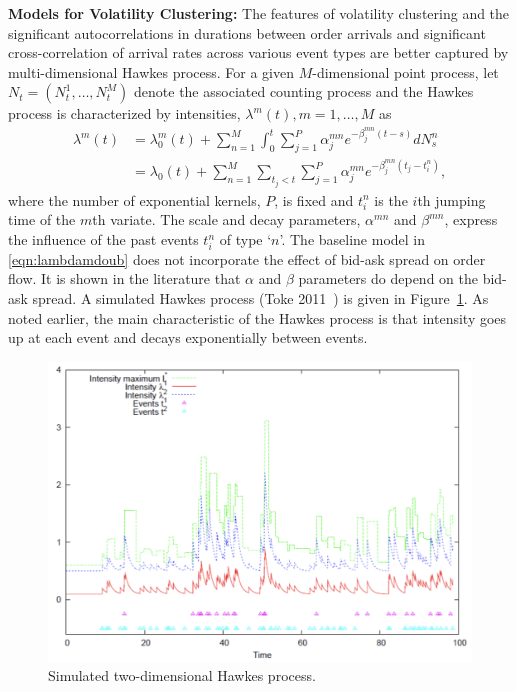 \noindent\textbf{Models for Volatility Clustering:} \label{in:volclust2} The features of volatility clustering and the significant autocorrelations in durations between order arrivals and significant cross-correlation of arrival rates across various event types are better captured by multi-dimensional Hawkes process. For a given $M$-dimensional point process, let $N_t=(N_t^1,\ldots,N_t^M)$ denote the associated counting process and the Hawkes process is characterized by intensities, $\lambda^m(t), m=1,\ldots,M$ as
	\begin{equation} \label{eqn:lambdamdoub}
	\begin{aligned}
	\lambda^m(t)&= \lambda_0^m(t) + \sum_{n=1}^M \int_0^t \sum_{j=1}^P \alpha_j^{mn} e^{-\beta_j^{mn}(t - s)} dN_s^n \\
	&=\lambda_0(t) + \sum_{n=1}^M \sum_{t_j<t} \sum_{j=1}^P \alpha_j^{mn} e^{-\beta_j^{mn}(t_j -t_i^n)},
	\end{aligned}
	\end{equation}
where the number of exponential kernels, $P$, is fixed and $t_i^n$ is the $i$th jumping time of the $m$th variate. The scale and decay parameters, $\alpha^{mn}$ and $\beta^{mn}$, express the influence of the past events $t_i^n$ of type `$n$'. The baseline model in \eqref{eqn:lambdamdoub} does not incorporate the effect of bid-ask spread on order flow. It is shown in the literature that $\alpha$ and $\beta$ parameters do depend on the bid-ask spread. A simulated Hawkes process (Toke 2011~\cite{toke}) is given in Figure~\ref{fig:hawkes}. As noted earlier, the main characteristic of the Hawkes process is that intensity goes up at each event and decays exponentially between events. 
	\begin{figure}[!ht]
   	\centering
   	\includegraphics[width=\textwidth]{chapters/chapter_trade_data_models/figures/hawkes.png} 
   	\caption{Simulated two-dimensional Hawkes process.\label{fig:hawkes}}
	\end{figure}


